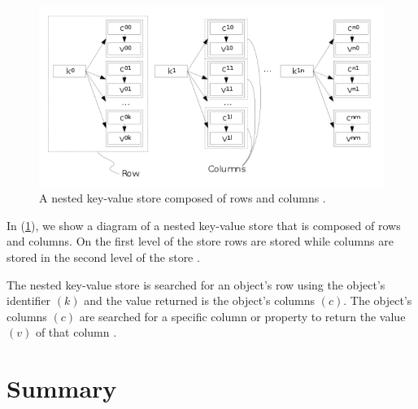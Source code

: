 {\begin{figure}[t]
\centering
\includegraphics[width=15cm]{pics/NestedKey-ValueStore.png}
\caption{A nested key-value store composed of rows and columns \cite{ladwig2011cumulusrdf}.}
\label{fig_nestedKey-ValueStore}
\end{figure} 

In (\ref{fig_nestedKey-ValueStore}), we show a diagram of a nested key-value store that is composed of rows and columns. On the first level of the store rows are stored while columns are stored in the second level of the store \cite{ladwig2011cumulusrdf}.

The nested key-value store is searched for an object's row using the object's identifier $(k)$ and the value returned is the object's columns $(c)$. The object's columns $(c)$ are searched for a specific column or property to return the value $(v)$ of that column \cite{ladwig2011cumulusrdf}.






\section{Summary}
\label{sec:BackgroundSummary}

}
